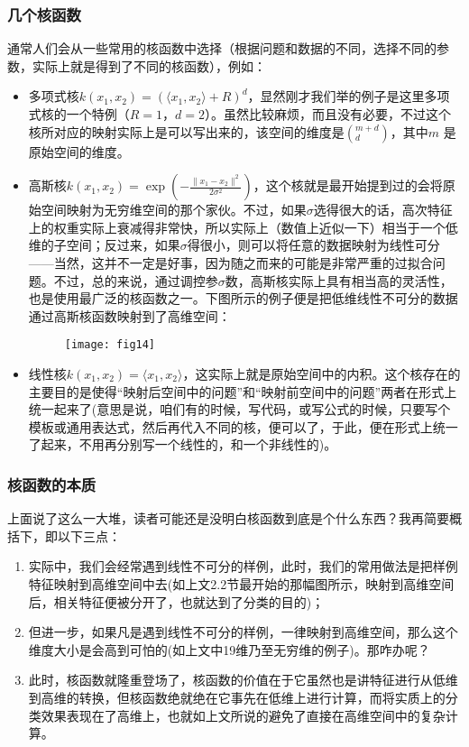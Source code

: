\documentclass[a4paper,12pt]{article}
\begin{document}
 \subsubsection{几个核函数}
  通常人们会从一些常用的核函数中选择（根据问题和数据的不同，选择不同的参数，实际上就是得到了不同的核函数），例如：
\begin{itemize}
  \item 多项式核$k(x_1,x_2)=(\langle x_1,x_2\rangle+R)^d$，显然刚才我们举的例子是这里多项式核的一个特例（$R = 1$，$d = 2$）。虽然比较麻烦，而且没有必要，不过这个核所对应的映射实际上是可以写出来的，该空间的维度是$(_d^{m+d})$，其中$m$ 是原始空间的维度。
  \item 高斯核$k(x_1,x_2)=\exp\left(-\frac{\|x_1-x_2\|^2}{2\sigma^2}\right)$，这个核就是最开始提到过的会将原始空间映射为无穷维空间的那个家伙。不过，如果$\sigma$选得很大的话，高次特征上的权重实际上衰减得非常快，所以实际上（数值上近似一下）相当于一个低维的子空间；反过来，如果$\sigma$得很小，则可以将任意的数据映射为线性可分——当然，这并不一定是好事，因为随之而来的可能是非常严重的过拟合问题。不过，总的来说，通过调控参$\sigma$数，高斯核实际上具有相当高的灵活性，也是使用最广泛的核函数之一。下图所示的例子便是把低维线性不可分的数据通过高斯核函数映射到了高维空间：
  \begin{figure}[H]
    \centering
    \texttt{[image: fig14]}
  \end{figure}
\item 线性核$k(x_1,x_2)=\langle x_1,x_2\rangle$，这实际上就是原始空间中的内积。这个核存在的主要目的是使得“映射后空间中的问题”和“映射前空间中的问题”两者在形式上统一起来了(意思是说，咱们有的时候，写代码，或写公式的时候，只要写个模板或通用表达式，然后再代入不同的核，便可以了，于此，便在形式上统一了起来，不用再分别写一个线性的，和一个非线性的)。
  \end{itemize}

\subsubsection{核函数的本质}

上面说了这么一大堆，读者可能还是没明白核函数到底是个什么东西？我再简要概括下，即以下三点：
\begin{enumerate}[1.~]
  \item 实际中，我们会经常遇到线性不可分的样例，此时，我们的常用做法是把样例特征映射到高维空间中去(如上文2.2节最开始的那幅图所示，映射到高维空间后，相关特征便被分开了，也就达到了分类的目的)；
\item 但进一步，如果凡是遇到线性不可分的样例，一律映射到高维空间，那么这个维度大小是会高到可怕的(如上文中19维乃至无穷维的例子)。那咋办呢？
\item 此时，核函数就隆重登场了，核函数的价值在于它虽然也是讲特征进行从低维到高维的转换，但核函数绝就绝在它事先在低维上进行计算，而将实质上的分类效果表现在了高维上，也就如上文所说的避免了直接在高维空间中的复杂计算。
\end{enumerate}
\end{document}
